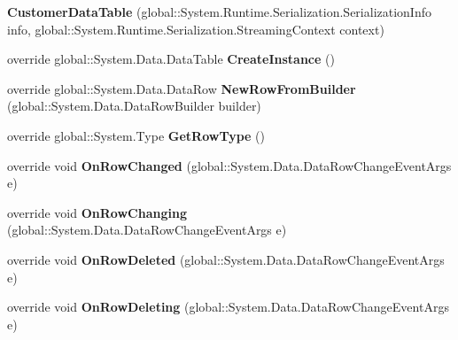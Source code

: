 \begin{DoxyCompactItemize}
\item 
{\bfseries Customer\+Data\+Table} (global\+::\+System.\+Runtime.\+Serialization.\+Serialization\+Info info, global\+::\+System.\+Runtime.\+Serialization.\+Streaming\+Context context)\hypertarget{class_products_1_1_data_1_1ds_sage_1_1_customer_data_table_a90249e7dbd850e87e21f6763da11dc44}{}\label{class_products_1_1_data_1_1ds_sage_1_1_customer_data_table_a90249e7dbd850e87e21f6763da11dc44}

\item 
override global\+::\+System.\+Data.\+Data\+Table {\bfseries Create\+Instance} ()\hypertarget{class_products_1_1_data_1_1ds_sage_1_1_customer_data_table_a0f3b2558193ab9833e273aff6565b5b4}{}\label{class_products_1_1_data_1_1ds_sage_1_1_customer_data_table_a0f3b2558193ab9833e273aff6565b5b4}

\item 
override global\+::\+System.\+Data.\+Data\+Row {\bfseries New\+Row\+From\+Builder} (global\+::\+System.\+Data.\+Data\+Row\+Builder builder)\hypertarget{class_products_1_1_data_1_1ds_sage_1_1_customer_data_table_a7b111f5adbadf866b4e293e7aa9f521f}{}\label{class_products_1_1_data_1_1ds_sage_1_1_customer_data_table_a7b111f5adbadf866b4e293e7aa9f521f}

\item 
override global\+::\+System.\+Type {\bfseries Get\+Row\+Type} ()\hypertarget{class_products_1_1_data_1_1ds_sage_1_1_customer_data_table_ab5e1bd8ff45c77891c2309ab51b61e43}{}\label{class_products_1_1_data_1_1ds_sage_1_1_customer_data_table_ab5e1bd8ff45c77891c2309ab51b61e43}

\item 
override void {\bfseries On\+Row\+Changed} (global\+::\+System.\+Data.\+Data\+Row\+Change\+Event\+Args e)\hypertarget{class_products_1_1_data_1_1ds_sage_1_1_customer_data_table_a6771ced3b11640557683e1cad2c48bcb}{}\label{class_products_1_1_data_1_1ds_sage_1_1_customer_data_table_a6771ced3b11640557683e1cad2c48bcb}

\item 
override void {\bfseries On\+Row\+Changing} (global\+::\+System.\+Data.\+Data\+Row\+Change\+Event\+Args e)\hypertarget{class_products_1_1_data_1_1ds_sage_1_1_customer_data_table_a09b4fe6d239c00b383c63836d29bbe12}{}\label{class_products_1_1_data_1_1ds_sage_1_1_customer_data_table_a09b4fe6d239c00b383c63836d29bbe12}

\item 
override void {\bfseries On\+Row\+Deleted} (global\+::\+System.\+Data.\+Data\+Row\+Change\+Event\+Args e)\hypertarget{class_products_1_1_data_1_1ds_sage_1_1_customer_data_table_a0c9e458e78975b032617cc474af71e9d}{}\label{class_products_1_1_data_1_1ds_sage_1_1_customer_data_table_a0c9e458e78975b032617cc474af71e9d}

\item 
override void {\bfseries On\+Row\+Deleting} (global\+::\+System.\+Data.\+Data\+Row\+Change\+Event\+Args e)\hypertarget{class_products_1_1_data_1_1ds_sage_1_1_customer_data_table_a578ffc6ad9f0ccff883426217ef95e71}{}\label{class_products_1_1_data_1_1ds_sage_1_1_customer_data_table_a578ffc6ad9f0ccff883426217ef95e71}

\end{DoxyCompactItemize}
